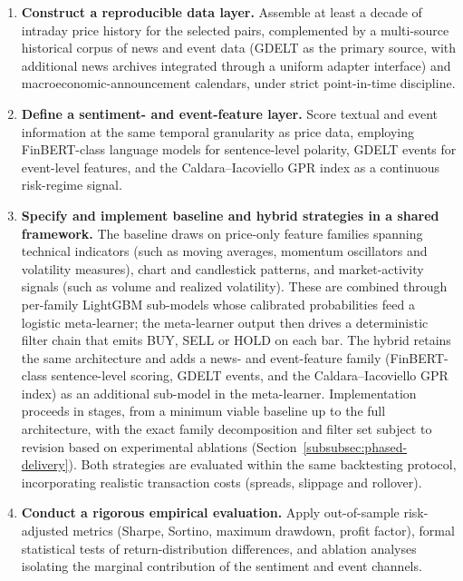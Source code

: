 \begin{enumerate}
    \item \textbf{Construct a reproducible data layer.} Assemble at least a decade of intraday price history for the selected pairs, complemented by a multi-source historical corpus of news and event data (GDELT \cite{leetaru2013gdelt} as the primary source, with additional news archives integrated through a uniform adapter interface) and macroeconomic-announcement calendars, under strict point-in-time discipline.

    \item \textbf{Define a sentiment- and event-feature layer.} Score textual and event information at the same temporal granularity as price data, employing FinBERT-class language models \cite{araci2019finbert,yang2020finbert} for sentence-level polarity, GDELT events for event-level features, and the Caldara--Iacoviello GPR index \cite{caldara2022geopolitical} as a continuous risk-regime signal.

    \item \textbf{Specify and implement baseline and hybrid strategies in a shared framework.} The baseline draws on price-only feature families spanning technical indicators (such as moving averages, momentum oscillators and volatility measures), chart and candlestick patterns, and market-activity signals (such as volume and realized volatility). These are combined through per-family LightGBM sub-models whose calibrated probabilities feed a logistic meta-learner; the meta-learner output then drives a deterministic filter chain that emits BUY, SELL or HOLD on each bar. The hybrid retains the same architecture and adds a news- and event-feature family (FinBERT-class sentence-level scoring, GDELT events, and the Caldara--Iacoviello GPR index) as an additional sub-model in the meta-learner. Implementation proceeds in stages, from a minimum viable baseline up to the full architecture, with the exact family decomposition and filter set subject to revision based on experimental ablations (Section~\ref{subsubsec:phased-delivery}). Both strategies are evaluated within the same backtesting protocol, incorporating realistic transaction costs (spreads, slippage and rollover).

    \item \textbf{Conduct a rigorous empirical evaluation.} Apply out-of-sample risk-adjusted metrics (Sharpe, Sortino, maximum drawdown, profit factor), formal statistical tests of return-distribution differences, and ablation analyses isolating the marginal contribution of the sentiment and event channels.
\end{enumerate}

